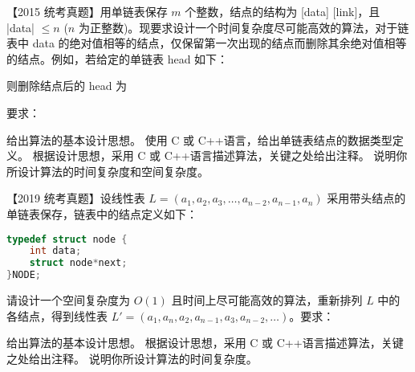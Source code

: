 \begin{qitems}
    \begin{bbox}
        \qitem 【2015 统考真题】用单链表保存 $m$ 个整数，结点的结构为 [data] [link]，且 |data| $\le n$ ($n$ 为正整数)。现要求设计一个时间复杂度尽可能高效的算法，对于链表中 data 的绝对值相等的结点，仅保留第一次出现的结点而删除其余绝对值相等的结点。例如，若给定的单链表 head 如下：
        
        
        则删除结点后的 head 为
        
        
        要求：
        \begin{subqitems}
            \subqitem 给出算法的基本设计思想。
            \subqitem 使用 C 或 C++语言，给出单链表结点的数据类型定义。
            \subqitem 根据设计思想，采用 C 或 C++语言描述算法，关键之处给出注释。
            \subqitem 说明你所设计算法的时间复杂度和空间复杂度。
        \end{subqitems}
    \end{bbox}

    \begin{bbox}
        \qitem 【2019 统考真题】设线性表 $L=(a_1,a_2,a_3,\dots,a_{n-2},a_{n-1},a_n)$ 采用带头结点的单链表保存，链表中的结点定义如下：
        \begin{lstlisting}[language=C, basicstyle=\ttfamily\small]
typedef struct node {
    int data;
    struct node*next;
}NODE;
        \end{lstlisting}
        请设计一个空间复杂度为 $O(1)$ 且时间上尽可能高效的算法，重新排列 $L$ 中的各结点，得到线性表 $L'=(a_1,a_n,a_2,a_{n-1},a_3,a_{n-2},\dots)$。要求：
        \begin{subqitems}
            \subqitem 给出算法的基本设计思想。
            \subqitem 根据设计思想，采用 C 或 C++语言描述算法，关键之处给出注释。
            \subqitem 说明你所设计算法的时间复杂度。
        \end{subqitems}
    \end{bbox}

\end{qitems} 